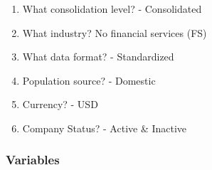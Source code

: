 \documentclass[12pt]{article}
\begin{document}
        \begin{enumerate}
            \item What consolidation level? - Consolidated
            \item What industry? No financial services (FS) 
            \item What data format?  - Standardized 
            \item Population source? - Domestic 
            \item Currency? - USD 
            \item Company Status? - Active \& Inactive  
        \end{enumerate}

    \subsubsection{Variables}
\end{document}
